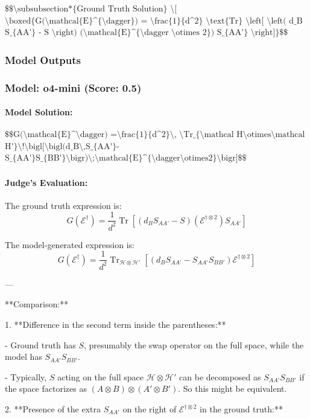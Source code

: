 \documentclass[10pt]{article}
\begin{document}
\[\subsubsection*{Ground Truth Solution}
\[ \boxed{G(\mathcal{E}^{\dagger}) = \frac{1}{d^2} \text{Tr} \left[ \left( d_B S_{AA'} - S \right) (\mathcal{E}^{\dagger \otimes 2}) S_{AA'} \right]} \]

\subsubsection*{Model Outputs}
\subsubsection*{Model: o4-mini (Score: 0.5)}
\paragraph*{Model Solution:}
\[ G(\mathcal{E}^\dagger)
=\frac{1}{d^2}\,
\Tr_{\mathcal H\otimes\mathcal H'}\!\bigl[\bigl(d_B\,S_{AA'}-S_{AA'}S_{BB'}\bigr)\;\mathcal{E}^{\dagger\otimes2}\bigr] \]

\paragraph*{Judge's Evaluation:}

The ground truth expression is:
\[
G(\mathcal{E}^{\dagger}) = \frac{1}{d^2} \operatorname{Tr} \left[ \left( d_B S_{AA'} - S \right) (\mathcal{E}^{\dagger \otimes 2}) S_{AA'} \right]
\]

The model-generated expression is:
\[
G(\mathcal{E}^\dagger) = \frac{1}{d^2} \operatorname{Tr}_{\mathcal{H} \otimes \mathcal{H}'} \left[ \left( d_B S_{AA'} - S_{AA'} S_{BB'} \right) \mathcal{E}^{\dagger \otimes 2} \right]
\]

---

**Comparison:**

1. **Difference in the second term inside the parentheses:**

- Ground truth has \( S \), presumably the swap operator on the full space, while the model has \( S_{AA'} S_{BB'} \).

- Typically, \( S \) acting on the full space \( \mathcal{H} \otimes \mathcal{H}' \) can be decomposed as \( S_{AA'} S_{BB'} \) if the space factorizes as \( (A \otimes B) \otimes (A' \otimes B') \). So this might be equivalent.

2. **Presence of the extra \( S_{AA'} \) on the right of \( \mathcal{E}^{\dagger \otimes 2} \) in the ground truth:**

\]
\end{document}
